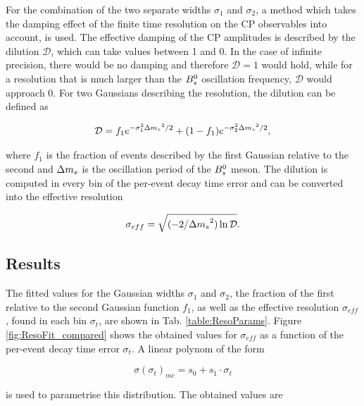 For the combination of the two separate widths $\sigma_{1}$ and $\sigma_{2}$, a method which takes the damping effect of the finite time resolution on the CP observables into account, is used.
The effective damping of the CP amplitudes is described by the dilution $\mathcal{D}$, which can take values between 1 and 0. 
In the case of infinite precision, there would be no damping and therefore  $\mathcal{D} = 1$ would hold, while for a resolution that is much larger than the ${{B}^0_{s}}$ oscillation frequency, $\mathcal{D}$ would approach 0.
For two Gaussians describing the resolution, the dilution can be defined as \cite{Aaij:2017lff}

\begin{equation}
\mathcal{D} = f_{1}e^{-\sigma_{1}^{2}{\Delta m_{{s}}}^{2}/2} + (1 - f_{1}) e^{-\sigma_{2}^{2}{\Delta m_{{s}}}^{2}/2},
\label{eq:t-dilution}
\end{equation}   

where $f_{1}$ is the fraction of events described by the first Gaussian relative to the second and ${\Delta m_{{s}}}$ is the oscillation period of the ${{B}^0_{s}}$ meson. \newline   
The dilution is computed in every bin of the per-event decay time error and can be converted into the effective resolution

\begin{equation}
\sigma_{eff} = \sqrt{(-2/{\Delta m_{{s}}}^{2})\ln{\mathcal{D}}}.
\label{eq:effres}
\end{equation}




\subsection{Results}

The fitted values for the Gaussian widths $\sigma_{1}$ and $\sigma_{2}$, 
the fraction of the first relative to the second Gaussian function $f_{1}$, as well as the effective resolution $\sigma_{eff}$, found in each bin $\sigma_{t}$, are shown in Tab. \ref{table:ResoParams}.
Figure \ref{fig:ResoFit_compared} shows the obtained values for $\sigma_{eff}$ as a function of the per-event decay time error $\sigma_{t}$. A linear polynom of the form  

\begin{equation}
\sigma(\sigma_{t})_{mc} = s_{0} + s_{1}\cdot \sigma_{t} 
\label{eq:resfit}
\end{equation}

is used to parametrise this distribution. The obtained values are 

